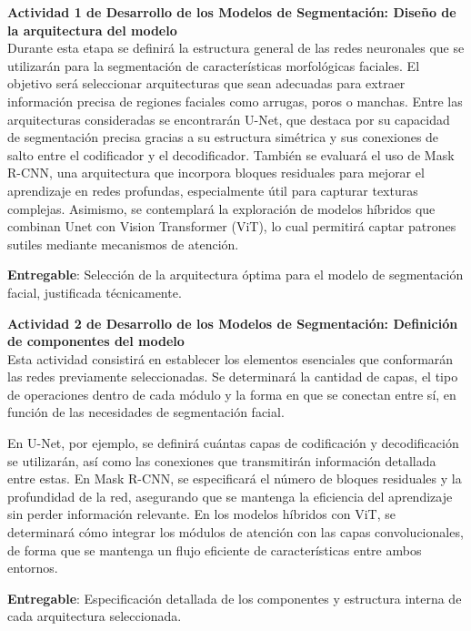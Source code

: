  \textbf{Actividad 1 de Desarrollo de los Modelos de Segmentación: Diseño de la arquitectura del modelo}
 \\
 Durante esta etapa se definirá la estructura general de las redes neuronales que se utilizarán para la segmentación de características morfológicas faciales. El objetivo será seleccionar arquitecturas que sean adecuadas para extraer información precisa de regiones faciales como arrugas, poros o manchas.
 Entre las arquitecturas consideradas se encontrarán U-Net, que destaca por su capacidad de segmentación precisa gracias a su estructura simétrica y sus conexiones de salto entre el codificador y el decodificador. También se evaluará el uso de Mask R-CNN, una arquitectura que incorpora bloques residuales para mejorar el aprendizaje en redes profundas, especialmente útil para capturar texturas complejas. Asimismo, se contemplará la exploración de modelos híbridos que combinan Unet con Vision Transformer (ViT), lo cual permitirá captar patrones sutiles mediante mecanismos de atención.
 
 \textbf{Entregable}: Selección de la arquitectura óptima para el modelo de segmentación facial, justificada técnicamente.

 \textbf{Actividad 2 de Desarrollo de los Modelos de Segmentación: Definición de componentes del modelo}
 \\
Esta actividad consistirá en establecer los elementos esenciales que conformarán las redes previamente seleccionadas. Se determinará la cantidad de capas, el tipo de operaciones dentro de cada módulo y la forma en que se conectan entre sí, en función de las necesidades de segmentación facial.

En U-Net, por ejemplo, se definirá cuántas capas de codificación y decodificación se utilizarán, así como las conexiones que transmitirán información detallada entre estas. En Mask R-CNN, se especificará el número de bloques residuales y la profundidad de la red, asegurando que se mantenga la eficiencia del aprendizaje sin perder información relevante. En los modelos híbridos con ViT, se determinará cómo integrar los módulos de atención con las capas convolucionales, de forma que se mantenga un flujo eficiente de características entre ambos entornos.

 \textbf{Entregable}: Especificación detallada de los componentes y estructura interna de cada arquitectura seleccionada.

